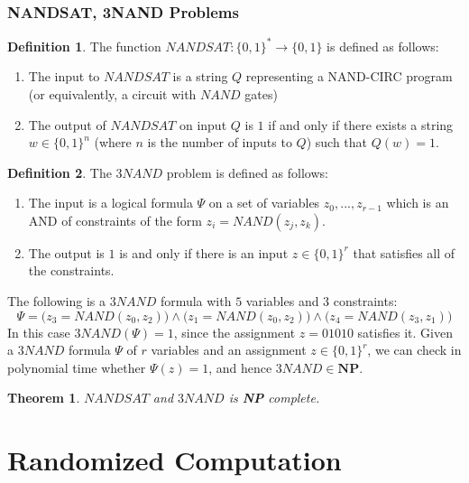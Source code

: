\documentclass[a4paper, 12pt]{report}
\newtheorem{theorem}{Theorem}[section]
\theoremstyle{remark}
\theoremstyle{definition}
\newtheorem{definition}{Definition}[section]
\begin{document}
\subsection{NANDSAT, 3NAND Problems}
\begin{definition}
The function $NANDSAT: \{0,1\}^* \longrightarrow \{0,1\}$ is defined as follows: 
\begin{enumerate}
    \item The input to $NANDSAT$ is a string $Q$ representing a NAND-CIRC program (or equivalently, a circuit with $NAND$ gates)
    \item The output of $NANDSAT$ on input $Q$ is $1$ if and only if there exists a string $w \in \{0,1\}^n$ (where $n$ is the number of inputs to $Q$) such that $Q(w) = 1$. 
\end{enumerate}
\end{definition}

\begin{definition}
The $3NAND$ problem is defined as follows: 
\begin{enumerate}
    \item The input is a logical formula $\Psi$ on a set of variables $z_0, ..., z_{r-1}$ which is an AND of constraints of the form $z_i = NAND(z_j, z_k)$. 
    \item The output is $1$ is and only if there is an input $z \in \{0, 1\}^r$ that satisfies all of the constraints. 
\end{enumerate}
\end{definition}

\begin{example}
The following is a $3NAND$ formula with $5$ variables and $3$ constraints:
\[\Psi = \big( z_3 = NAND(z_0, z_2)\big) \wedge \big( z_1 = NAND(z_0, z_2)\big) \wedge \big( z_4 = NAND(z_3, z_1)\big)\]
In this case $3NAND(\Psi) = 1$, since the assignment $z = 01010$ satisfies it. Given a $3NAND$ formula $\Psi$ of $r$ variables and an assignment $z \in \{0,1\}^r$, we can check in polynomial time whether $\Psi (z) = 1$, and hence $3NAND \in \mathbf{NP}$. 
\end{example}

\begin{theorem}
$NANDSAT$ and $3NAND$ is \textbf{NP} complete. 
\end{theorem}

\chapter{Randomized Computation}
\end{document}
